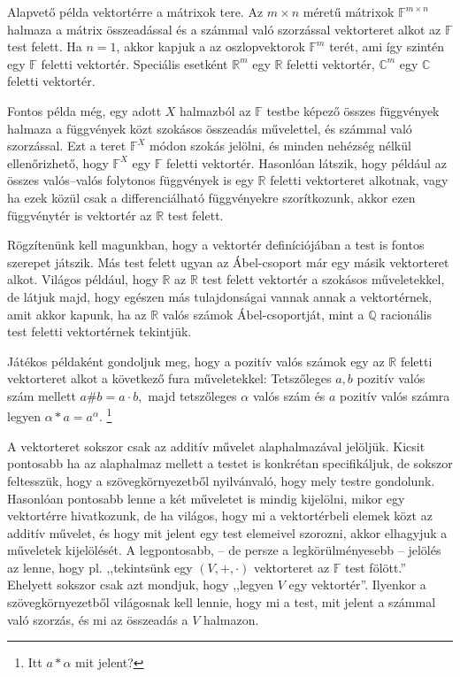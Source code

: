 \documentclass[9pt, a4paper, showtrims]{memoir}
\theoremstyle{plain}
\theoremstyle{remark}
\theoremstyle{definition}
\begin{document}
Alapvető példa vektortérre a mátrixok tere.
Az $m\times n$ méretű mátrixok $\mathbb{F}^{m\times n}$ halmaza a mátrix összeadással és a számmal való szorzással
vektorteret alkot az $\mathbb{F}$ test felett.
Ha $n=1$, akkor kapjuk a az oszlopvektorok $\mathbb{F}^m$ terét, ami így szintén egy $\mathbb{F}$ feletti vektortér.
Speciális esetként $\mathbb{R}^m$ egy $\mathbb{R}$ feletti vektortér,
$\mathbb{C}^m$ egy $\mathbb{C}$ feletti vektortér.

Fontos példa még, egy adott $X$ halmazból az $\mathbb{F}$ testbe képező összes függvények halmaza 
a függvények közt szokásos összeadás művelettel, és számmal való szorzással. 
Ezt a teret $\mathbb{F}^X$ módon szokás jelölni, és minden nehézség nélkül ellenőrizhető, 
hogy $\mathbb{F}^X$ egy $\mathbb{F}$ feletti vektortér.
Hasonlóan látszik, hogy például az összes valós--valós folytonos függvények is egy $\mathbb{R}$
feletti vektorteret alkotnak, vagy ha ezek közül csak a differenciálható függvényekre szorítkozunk,
akkor ezen függvénytér is vektortér az $\mathbb{R}$ test felett.

Rögzítenünk kell magunkban, hogy a vektortér definíciójában a test is fontos szerepet játszik.
Más test felett ugyan az Ábel-csoport már egy másik vektorteret alkot.
Világos például, hogy $\mathbb{R}$ az $\mathbb{R}$ test felett vektortér a szokásos műveletekkel,
de látjuk majd, hogy egészen más tulajdonságai vannak annak a vektortérnek, 
amit akkor kapunk, 
ha az $\mathbb{R}$ valós számok Ábel-csoportját, 
mint a $\mathbb{Q}$ racionális test feletti vektortérnek tekintjük.

Játékos példaként gondoljuk meg, 
hogy a pozitív valós számok egy az $\mathbb{R}$ feletti vektorteret alkot a következő fura műveletekkel:
Tetszőleges $a,b$ pozitív valós szám mellett
\(
a\#b=a\cdot b, 
\)
majd tetszőleges $\alpha$ valós szám és $a$ pozitív valós számra legyen
\(
\alpha\ast a=a^\alpha.
\)
\footnote{Itt $a\ast\alpha$ mit jelent?}

A vektorteret sokszor csak az additív művelet alaphalmazával jelöljük.
Kicsit pontosabb ha az alaphalmaz mellett a testet is konkrétan specifikáljuk, 
de sokszor feltesszük, hogy a szövegkörnyezetből nyilvánvaló, hogy mely testre gondolunk.
Hasonlóan pontosabb lenne a két műveletet is mindig kijelölni, mikor egy vektortérre hivatkozunk,
de ha világos, hogy mi a vektortérbeli elemek közt az additív művelet, és hogy mit jelent egy test elemeivel szorozni,
akkor elhagyjuk a műveletek kijelölését.
A legpontosabb, -- de persze a legkörülményesebb -- jelölés az lenne, hogy pl.
,,tekintsünk egy $\left( V,+,\cdot \right)$ vektorteret az $\mathbb{F}$ test fölött.''
Ehelyett sokszor csak azt mondjuk, hogy
,,legyen $V$ egy vektortér''. 
Ilyenkor a szövegkörnyezetből világosnak kell lennie, hogy mi a test, mit jelent a számmal való szorzás, és mi az összeadás a $V$ halmazon.
\end{document}
